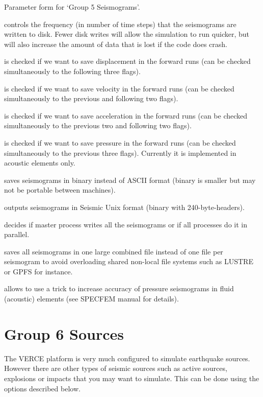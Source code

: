 \documentclass[english]{book}
\begin{document}
 Parameter form for ‘Group 5 \textendash{} Seismograms’.

 controls the frequency (in number
of time steps) that the seismograms are written to disk. Fewer disk
writes will allow the simulation to run quicker, but will also increase
the amount of data that is lost if the code does crash.

 is checked if we want to save
displacement in the forward runs (can be checked simultaneously to the
following three flags).

 is checked if we want to save velocity
in the forward runs (can be checked simultaneously to the previous and
following two flags).

 is checked if we want to save
acceleration in the forward runs (can be checked simultaneously to the
previous two and following two flags).

 is checked if we want to save pressure
in the forward runs (can be checked simultaneously to the previous three
flags). Currently it is implemented in acoustic elements only.

 saves seismograms in binary instead of
ASCII format (binary is smaller but may not be portable between
machines).

 outputs seismograms in Seismic Unix format (binary with
240-byte-headers).

 decides if master process writes all
the seismograms or if all processes do it in parallel.

 saves all seismograms in one large
combined file instead of one file per seismogram to avoid overloading
shared non-local file systems such as LUSTRE or GPFS for instance.

 allows to use a trick to increase
accuracy of pressure seismograms in fluid (acoustic) elements (see
SPECFEM manual for details).


\section{Group 6 \textendash{} Sources}
\label{\detokenize{Appendix1:a1-7-group-6-sources}}
The VERCE platform is very much configured to simulate earthquake
sources. However there are other types of seismic sources such as active
sources, explosions or impacts that you may want to simulate. This can
be done using the options described below.
\end{document}
